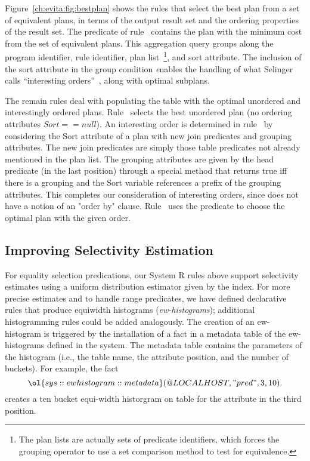 Figure~\ref{ch:evita:fig:bestplan} shows the rules that select the best plan
from a set of equivalent plans, in terms of the output result set and the
ordering properties of the result set.  The  predicate of
rule~ contains the plan with the minimum cost from the set of
equivalent plans.  This aggregation query groups along the program identifier,
rule identifier, plan list~\footnote{The plan lists are actually sets of
predicate identifiers, which forces the grouping operator to use a set
comparison method to test for equivalence.}, and sort attribute.  The inclusion
of the sort attribute in the group condition {\emph enables} the handling of
what Selinger calls ``interesting orders''~\cite{selinger}, along with optimal
subplans.

The remain rules deal with populating the  table with the optimal
unordered and interestingly ordered plans.  Rule~ selects the best
unordered plan (no ordering attributes $Sort == null$).  An interesting order
is determined in rule~ by considering the Sort attribute of a plan with
new join predicates and grouping attributes.  The new join predicates are
simply those table predicates not already mentioned in the plan list.  The
grouping attributes are given by the head predicate (in the last position)
through a special method that returns true iff there is a grouping and the Sort
variable references a prefix of the grouping attributes.  This completes our
consideration of interesting orders, since \OVERLOG does not have a notion of
an "order by" clause.  Rule~ uses the  predicate
to choose the optimal plan with the given order.
 
\subsection{Improving Selectivity Estimation}

For equality selection predications, our System R rules above support selectivity
estimates using a uniform distribution estimator given by the index. For more precise
estimates and to handle range predicates, we have defined declarative rules that produce
equiwidth histograms ({\em ew-histograms}); additional histogramming rules could be
added analogously. The creation of an ew-histogram is triggered by the installation of a
fact in a metadata table of the ew-histograms defined in the system. The metadata table 
contains the parameters of the histogram (i.e., the table name, the attribute position,
and the number of buckets). For example, the fact
\[
\ol{sys::ewhistogram::metadata}(@LOCALHOST, "pred", 3, 10).
\]
creates a ten bucket equi-width historgram on table  for the attribute in the
third position.

